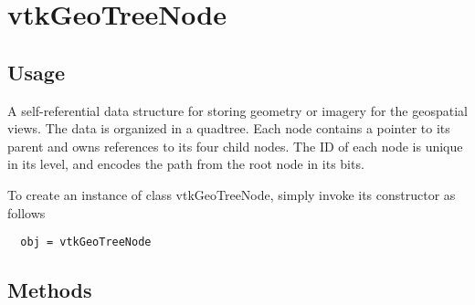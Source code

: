 \section{vtkGeoTreeNode}

\subsection{Usage}

 A self-referential data structure for storing geometry or imagery for
 the geospatial views. The data is organized in a quadtree. Each node
 contains a pointer to its parent and owns references to its four
 child nodes. The ID of each node is unique in its level, and encodes
 the path from the root node in its bits.

To create an instance of class vtkGeoTreeNode, simply
invoke its constructor as follows
\begin{verbatim}
  obj = vtkGeoTreeNode
\end{verbatim}
\subsection{Methods}

